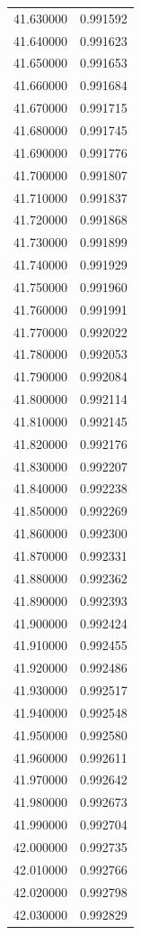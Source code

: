 \begin{tabular}{rr}
41.630000 & 0.991592 \\
41.640000 & 0.991623 \\
41.650000 & 0.991653 \\
41.660000 & 0.991684 \\
41.670000 & 0.991715 \\
41.680000 & 0.991745 \\
41.690000 & 0.991776 \\
41.700000 & 0.991807 \\
41.710000 & 0.991837 \\
41.720000 & 0.991868 \\
41.730000 & 0.991899 \\
41.740000 & 0.991929 \\
41.750000 & 0.991960 \\
41.760000 & 0.991991 \\
41.770000 & 0.992022 \\
41.780000 & 0.992053 \\
41.790000 & 0.992084 \\
41.800000 & 0.992114 \\
41.810000 & 0.992145 \\
41.820000 & 0.992176 \\
41.830000 & 0.992207 \\
41.840000 & 0.992238 \\
41.850000 & 0.992269 \\
41.860000 & 0.992300 \\
41.870000 & 0.992331 \\
41.880000 & 0.992362 \\
41.890000 & 0.992393 \\
41.900000 & 0.992424 \\
41.910000 & 0.992455 \\
41.920000 & 0.992486 \\
41.930000 & 0.992517 \\
41.940000 & 0.992548 \\
41.950000 & 0.992580 \\
41.960000 & 0.992611 \\
41.970000 & 0.992642 \\
41.980000 & 0.992673 \\
41.990000 & 0.992704 \\
42.000000 & 0.992735 \\
42.010000 & 0.992766 \\
42.020000 & 0.992798 \\
42.030000 & 0.992829 \\

\end{tabular}
